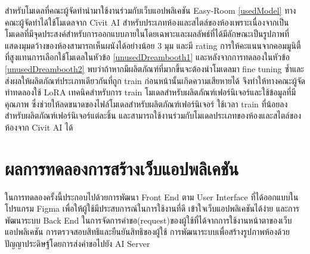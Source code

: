 \documentclass[12pt,oneside,openright,a4paper]{cpe-thai-project}
\begin{document}
\hspace{18pt}สำหรับโมเดลที่คณะผู้จัดทำนำมาใช้งานร่วมกับเว็บแอปพลิเคชัน Easy-Room \ref{usedModel}  ทางคณะผู้จัดทำได้ใช้โมเดลจาก Civit AI สำหรับประเภทห้องและสไตล์ของห้องเพราะเนื่องจากเป็นโมเดลที่มีจุดประสงค์สำหรับการออกแบบภายในโดยเฉพาะและผลลัพธ์ที่ได้มีลักษณะเป็นรูปภาพที่แสดงมุมดว้างของห้องสามารถเห็นผนังได้อย่างน้อย 3 มุม และมี rating การให้คะแนนจากคอมมูนิตี้ที่สูงแทนการเลือกใช้โมเดลในหัวข้อ \ref{unusedDreambooth1} และหลังจากการทดลองในหัวข้อ \ref{unusedDreambooth2} พบว่าถ้าหากมีผลิตภัณฑ์ที่มากขึ้นจะต้องนำโมเดลมา fine tuning ซ้ำและส่งผลให้ผลิตภัณฑ์ประเภทเดียวกันที่ถูก train ก่อนหน้านั้นเกิดความเสียหายได้ จึงทำให้ทางคณะผู้จัดทำทดลองใช้ LoRA เทคนิคสำหรับการ train โมเดลสำหรับผลิตภัณฑ์เฟอร์นิเจอร์และใช้ข้อมูลที่มีคุณภาพ ซึ่งช่วยให้ลดขนาดของไฟล์โมเดลสำหรับผลิตภัณฑ์เฟอร์นิเจอร์ ใช้เวลา train ที่น้อยลงสำหรับผลิตภัณฑ์เฟอร์นิเจอร์แต่ละชิ้น และสามารถใช้งานร่วมกับโมเดลประเภทของห้องและสไตล์ของห้องจาก Civit AI ได้

\section{ผลการทดลองการสร้างเว็บแอปพลิเคชัน}
\hspace{18pt}ในการทดลองครั้งนี้ประกอบไปด้วยการพัฒนา Front End ตาม User Interface ที่ได้ออกแบบในโปรแกรม Figma เพื่อให้ผู้ใช้มีประสบการณ์ในการใช้งานที่ดี เข้าใจเว็บแอปพลิเคชันได้ง่าย และการพัฒนาระบบ Back End ในการจัดการคำขอ(request)ของผู้ใช้ที่ได้จากการใช้งานหน้าตาของเว็บแอปพลิเคชัน การตรวจสอบสิทธิและยืนยันสิทธิของผู้ใช้ การพัฒนาระบบเพื่อสร้างรูปภาพห้องด้วยปัญญาประดิษฐ์โดยการส่งคำขอไปยัง AI Server
\end{document}
